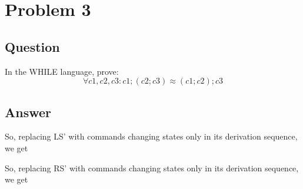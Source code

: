 \documentclass[a4paper, 11pt]{article}
\begin{document}
\section{Problem 3}

\subsection{Question}
In the WHILE language, prove:
$$\forall c1, c2, c3 : c1; (c2; c3) \approx (c1; c2); c3$$

\subsection{Answer}

\begin{prooftree}
     
  
\end{prooftree}
So, replacing LS' with commands changing states only in its derivation sequence, we get

\begin{prooftree}
 

\end{prooftree}

\begin{prooftree}
     
  
\end{prooftree}
So, replacing RS' with commands changing states only in its derivation sequence, we get
\end{document}
